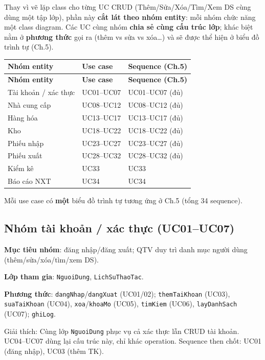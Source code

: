 Thay vì vẽ lặp class cho từng UC CRUD (Thêm/Sửa/Xóa/Tìm/Xem DS cùng dùng một tập lớp), phần này \textbf{cắt lát theo nhóm entity}: mỗi nhóm chức năng một class diagram. Các UC cùng nhóm \textbf{chia sẻ cùng cấu trúc lớp}; khác biệt nằm ở \textbf{phương thức} gọi ra (thêm vs sửa vs xóa\ldots) và sẽ được thể hiện ở biểu đồ trình tự (Ch.5).

\begin{longtable}{|p{4.5cm}|p{4cm}|p{4cm}|}
\hline
\textbf{Nhóm entity} & \textbf{Use case} & \textbf{Sequence (Ch.5)} \\
\hline
\endfirsthead
\hline
\textbf{Nhóm entity} & \textbf{Use case} & \textbf{Sequence (Ch.5)} \\
\hline
\endhead
Tài khoản / xác thực & UC01--UC07 & UC01--UC07 (đủ) \\
\hline
Nhà cung cấp & UC08--UC12 & UC08--UC12 (đủ) \\
\hline
Hàng hóa & UC13--UC17 & UC13--UC17 (đủ) \\
\hline
Kho & UC18--UC22 & UC18--UC22 (đủ) \\
\hline
Phiếu nhập & UC23--UC27 & UC23--UC27 (đủ) \\
\hline
Phiếu xuất & UC28--UC32 & UC28--UC32 (đủ) \\
\hline
Kiểm kê & UC33 & UC33 \\
\hline
Báo cáo NXT & UC34 & UC34 \\
\hline
\end{longtable}

Mỗi use case có \textbf{một} biểu đồ trình tự tương ứng ở Ch.5 (tổng 34 sequence).

\subsection{Nhóm tài khoản / xác thực (UC01--UC07)}

\textbf{Mục tiêu nhóm}: đăng nhập/đăng xuất; QTV duy trì danh mục người dùng (thêm/sửa/xóa/tìm/xem DS).

\textbf{Lớp tham gia}: \texttt{NguoiDung}, \texttt{LichSuThaoTac}.

\textbf{Phương thức}: \texttt{dangNhap}/\texttt{dangXuat} (UC01/02); \texttt{themTaiKhoan} (UC03), \texttt{suaTaiKhoan} (UC04), \texttt{xoa}/\texttt{khoaMo} (UC05), \texttt{timKiem} (UC06), \texttt{layDanhSach} (UC07); \texttt{ghiLog}.



Giải thích: Cùng lớp \texttt{NguoiDung} phục vụ cả xác thực lẫn CRUD tài khoản. UC04--UC07 dùng lại cấu trúc này, chỉ khác operation. Sequence then chốt: UC01 (đăng nhập), UC03 (thêm TK).

